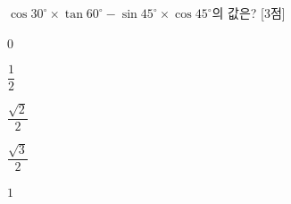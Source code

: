 $\cos 30^\circ\times\tan 60^\circ-\sin 45^\circ\times\cos 45^\circ$의 값은? \mbox{[3점]}
\begin{choices32}{\rule[-3ex]{0pt}{8ex}$0$}{\rule[-3ex]{0pt}{8ex}$\dfrac{1}{2}$}{\rule[-3ex]{0pt}{8ex}$\dfrac{\sqrt{2}}{2}$}{\rule[-3ex]{0pt}{8ex}$\dfrac{\sqrt{3}}{2}$}{\rule[-3ex]{0pt}{8ex}$1$}\end{choices32}

